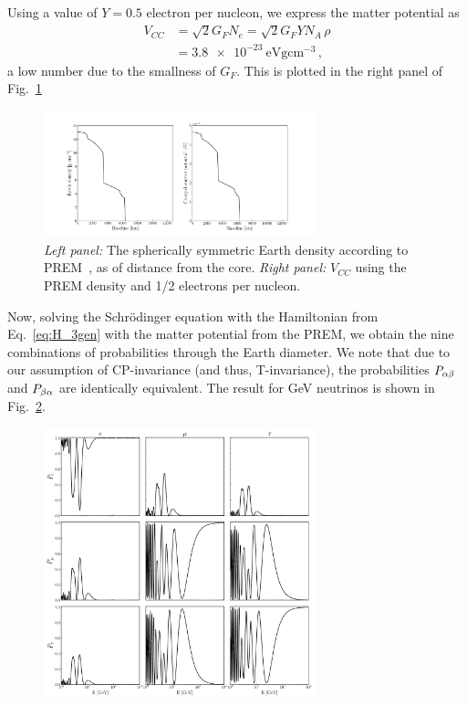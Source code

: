 Using a value of $Y=0.5$ electron per nucleon, we express the matter potential as
\begin{align}
    V_{CC} &= \sqrt{2}G_F N_e = \sqrt{2}G_F Y N_A \,\rho \nonumber \\
           &= \SI{3.8e-23}{\eV \gram \cm^{-3}}\,,
\end{align}
a low number due to the smallness of $G_F$. This is plotted in the right panel of Fig.~\ref{fig:potential}
\begin{figure}
    \centering
    \includegraphics[width=0.7\textwidth]{figures/potential.pdf}
    \caption{\emph{Left panel:} The spherically symmetric Earth density according to PREM~\cite{PREM}, as of distance from the core.
    \emph{Right panel:} $V_{CC}$ using the PREM density and 1/2 electrons per nucleon.}\label{fig:potential}
\end{figure}

Now, solving the Schrödinger equation with the Hamiltonian from Eq.~\ref{eq:H_3gen} with the matter potential from the PREM,
we obtain the nine combinations of probabilities through the Earth diameter. We note that due to our assumption of CP-invariance
(and thus, T-invariance), the probabilities $P_{\alpha\beta}$ and $P_{\beta\alpha}$ are identically equivalent. The result for \si{\GeV} neutrinos 
is shown in Fig.~\ref{fig:oscillations}.

\begin{figure}
    \centering
    \includegraphics[width=0.7\textwidth]{figures/oscillations.pdf}
    \caption{}\label{fig:oscillations}
\end{figure}

